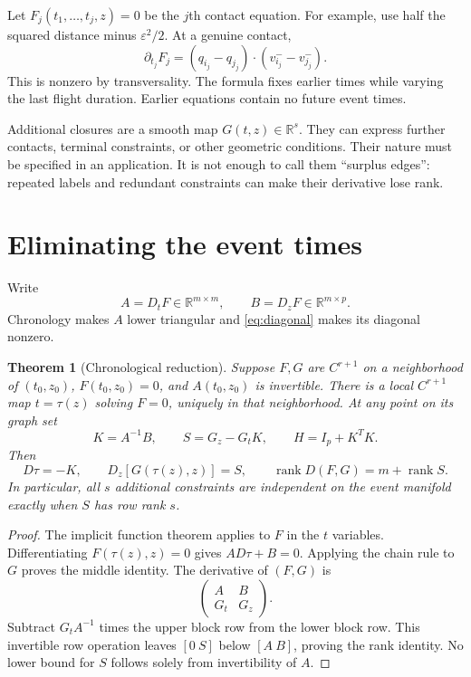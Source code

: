 \documentclass[11pt,reqno]{amsart}
\numberwithin{equation}{section}
\newtheorem{theorem}{Theorem}[section]
\theoremstyle{remark}\newtheorem{remark}[theorem]{Remark}
\newcommand{\R}{\mathbb R}\newcommand{\dd}{\,\mathrm d}
\newcommand{\rank}{\operatorname{rank}}\newcommand{\diag}{\operatorname{diag}}
\begin{document}
Let $F_j(t_1,\ldots,t_j,z)=0$ be the $j$th contact equation. For example, use half the squared distance minus $\varepsilon^2/2$. At a genuine contact,
\begin{equation}\label{eq:diagonal}
 \partial_{t_j}F_j
 =(q_{i_j}-q_{j_j})\cdot(v_{i_j}^--v_{j_j}^-).
\end{equation}
This is nonzero by transversality. The formula fixes earlier times while varying the last flight duration. Earlier equations contain no future event times.

Additional closures are a smooth map $G(t,z)\in\R^s$. They can express further contacts, terminal constraints, or other geometric conditions. Their nature must be specified in an application. It is not enough to call them ``surplus edges'': repeated labels and redundant constraints can make their derivative lose rank.

\section{Eliminating the event times}
Write
\[
 A=D_tF\in\R^{m\times m},\qquad B=D_zF\in\R^{m\times p}.
\]
Chronology makes $A$ lower triangular and \eqref{eq:diagonal} makes its diagonal nonzero.
\begin{theorem}[Chronological reduction]\label{thm:reduction}
Suppose $F,G$ are $C^{r+1}$ on a neighborhood of $(t_0,z_0)$, $F(t_0,z_0)=0$, and $A(t_0,z_0)$ is invertible. There is a local $C^{r+1}$ map $t=\tau(z)$ solving $F=0$, uniquely in that neighborhood. At any point on its graph set
\begin{equation}\label{eq:Schur}
 K=A^{-1}B,\qquad S=G_z-G_tK,\qquad H=I_p+K^TK.
\end{equation}
Then
\begin{equation}\label{eq:derivative-rank}
 D\tau=-K,\qquad D_z[G(\tau(z),z)]=S,\qquad
 \rank D(F,G)=m+\rank S.
\end{equation}
In particular, all $s$ additional constraints are independent on the event manifold exactly when $S$ has row rank $s$.
\end{theorem}
\begin{proof}
The implicit function theorem applies to $F$ in the $t$ variables. Differentiating $F(\tau(z),z)=0$ gives $AD\tau+B=0$. Applying the chain rule to $G$ proves the middle identity. The derivative of $(F,G)$ is
\[
 \begin{pmatrix}A&B\\G_t&G_z\end{pmatrix}.
\]
Subtract $G_tA^{-1}$ times the upper block row from the lower block row. This invertible row operation leaves $[0\ S]$ below $[A\ B]$, proving the rank identity. No lower bound for $S$ follows solely from invertibility of $A$.
\end{proof}
\end{document}

